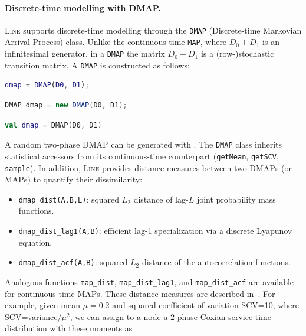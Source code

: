 \paragraph{Discrete-time modelling with DMAP.}
\label{dmap-modelling}
\textsc{Line} supports discrete-time modelling through the \texttt{DMAP} (Discrete-time Markovian Arrival Process) class.  Unlike the continuous-time \texttt{MAP}, where $D_0+D_1$ is an infinitesimal generator, in a \texttt{DMAP} the matrix $D_0+D_1$ is a (row-)stochastic transition matrix.  A \texttt{DMAP} is constructed as follows:
\begin{MATLAB}
\begin{lstlisting}[language = matlab]
dmap = DMAP(D0, D1);
\end{lstlisting}
\end{MATLAB}
\begin{JAVA}
\begin{lstlisting}[language = java, basicstyle=\ttfamily\scriptsize]
DMAP dmap = new DMAP(D0, D1);
\end{lstlisting}
\end{JAVA}
\begin{KOTLIN}
\begin{lstlisting}[language = kotlin, basicstyle=\ttfamily\scriptsize]
val dmap = DMAP(D0, D1)
\end{lstlisting}
\end{KOTLIN}
A random two-phase DMAP can be generated with .  The \texttt{DMAP} class inherits statistical accessors from its continuous-time counterpart (\texttt{getMean}, \texttt{getSCV}, \texttt{sample}).  In addition, \textsc{Line} provides distance measures between two DMAPs (or MAPs) to quantify their dissimilarity:
\begin{itemize}
\item \texttt{dmap\_dist(A,B,L)}: squared $L_2$ distance of lag-$L$ joint probability mass functions.
\item \texttt{dmap\_dist\_lag1(A,B)}: efficient lag-1 specialization via a discrete Lyapunov equation.
\item \texttt{dmap\_dist\_acf(A,B)}: squared $L_2$ distance of the autocorrelation functions.
\end{itemize}
Analogous functions \texttt{map\_dist}, \texttt{map\_dist\_lag1}, and \texttt{map\_dist\_acf} are available for continuous-time MAPs.  These distance measures are described in~\cite{Hor15MAP}.
For example, given mean $\mu=0.2$ and squared coefficient of variation SCV=10, where SCV=variance/$\mu^2$, we can assign to a node a $2$-phase Coxian service time distribution with these moments as

